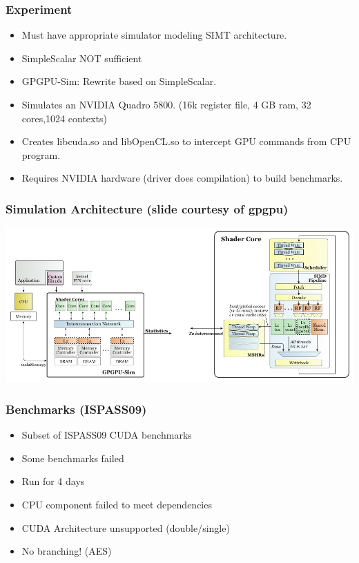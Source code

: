 \documentclass{beamer}
\begin{document}
\begin{frame}
   \frametitle{Experiment}
   \begin{itemize}
    \item<1-> Must have appropriate simulator modeling SIMT architecture.
    \item<2-> SimpleScalar NOT sufficient
    \item<3-> GPGPU-Sim: Rewrite based on SimpleScalar.
    \item<4-> Simulates an NVIDIA Quadro 5800. (16k register file, 4 GB ram, 32 cores,1024 contexts)
    \item<5-> Creates libcuda.so and libOpenCL.so to intercept GPU commands from CPU program.
    \item<6-> Requires NVIDIA hardware (driver does compilation) to build benchmarks.
   \end{itemize}
\end{frame}

\begin{frame}
 \frametitle{Simulation Architecture (slide courtesy of gpgpu)}
  \includegraphics[width=.9\textwidth]{uarch.jpg}

\end{frame}

\begin{frame}
 \frametitle{Benchmarks (ISPASS09)}
 \begin{itemize}
  \item<1-> Subset of ISPASS09 CUDA benchmarks
  \item<2-> Some benchmarks failed
  \item<3-> Run for 4 days
  \item<4-> CPU component failed to meet dependencies
  \item<5-> CUDA Architecture unsupported (double/single)
  \item<6-> No branching!  (AES)
 \end{itemize}
\end{frame}
\end{document}
